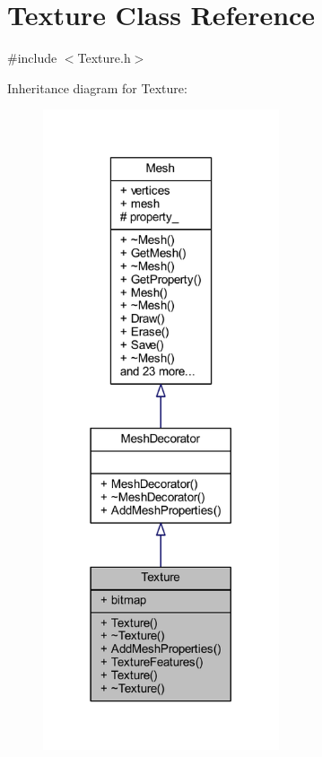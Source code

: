 \hypertarget{class_texture}{}\section{Texture Class Reference}
\label{class_texture}


{\ttfamily \#include $<$Texture.\+h$>$}



Inheritance diagram for Texture\+:
\nopagebreak
\begin{figure}[H]
\begin{center}
\leavevmode
\includegraphics[width=197pt]{class_texture__inherit__graph}
\end{center}
\end{figure}


